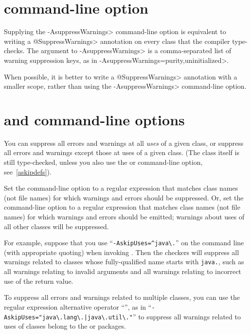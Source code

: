 \section{ command-line option\label{suppresswarnings-command-line}}

Supplying the \<-AsuppressWarnings> command-line option is equivalent to
writing a \<@SuppressWarnings> annotation on every class that the compiler
type-checks.  The argument to \<-AsuppressWarnings> is a comma-separated
list of warning suppression keys, as in
\<-AsuppressWarnings=purity,uninitialized>.

When possible, it is better to write a \<@SuppressWarnings> annotation with a
smaller scope, rather than using the \<-AsuppressWarnings> command-line option.


\section{ and  command-line options\label{askipuses}}

You can suppress all errors and warnings at all \emph{uses} of a given
class, or suppress all errors and warnings except those at uses of a given
class.  (The class itself is still type-checked, unless you also use
the  or  command-line option, see~\ref{askipdefs}).

Set the  command-line option to a
regular expression that matches class names (not file names) for which warnings and errors
should be suppressed.
Or, set the  command-line option to a
regular expression that matches class names (not file names) for which warnings and errors
should be emitted; warnings about uses of all other classes will be suppressed.

For example, suppose that you use
``{\codesize\verb|-AskipUses=^java\.|}'' on the command line
(with appropriate quoting) when invoking
.  Then the checkers will suppress all warnings related to
classes whose fully-qualified name starts with \codesize\verb|java.|, such
as all warnings relating to invalid arguments and all warnings relating to
incorrect use of the return value.

To suppress all errors and warnings related to multiple classes, you can use
the regular expression alternative operator ``\code{|}'', as in
``{\codesize\verb+-AskipUses="java\.lang\.|java\.util\."+}'' to suppress
all warnings related to uses of classes belong to the  or
 packages.


